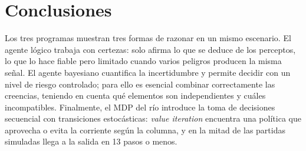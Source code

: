 \documentclass[11pt,a4paper]{article}
\begin{document}
\section{Conclusiones}

Los tres programas muestran tres formas de razonar en un mismo escenario. El agente lógico trabaja con certezas: solo afirma lo que se deduce de los perceptos, lo que lo hace fiable pero limitado cuando varios peligros producen la misma señal. El agente bayesiano cuantifica la incertidumbre y permite decidir con un nivel de riesgo controlado; para ello es esencial combinar correctamente las creencias, teniendo en cuenta qué elementos son independientes y cuáles incompatibles. Finalmente, el MDP del río introduce la toma de decisiones secuencial con transiciones estocásticas: \emph{value iteration} encuentra una política que aprovecha o evita la corriente según la columna, y en la mitad de las partidas simuladas llega a la salida en 13 pasos o menos.
\end{document}
